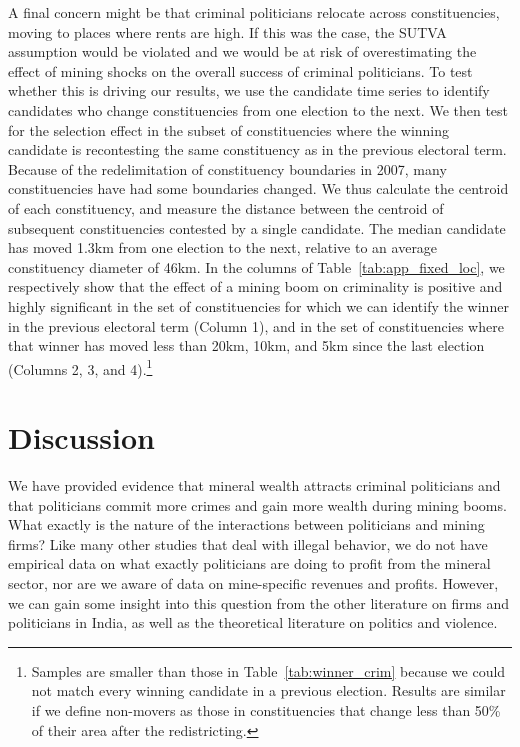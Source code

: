 \documentclass[12pt,letterpaper]{article}
\begin{document}
A final concern might be that criminal politicians relocate across
constituencies, moving to places where rents are high. If this was the
case, the SUTVA assumption would be violated and we would be at risk
of overestimating the effect of mining shocks on the overall success
of criminal politicians. To test whether this is driving our results,
we use the candidate time series to identify candidates who change
constituencies from one election to the next. We then test for the
selection effect in the subset of constituencies where the winning
candidate is recontesting the same constituency as in the previous
electoral term. Because of the redelimitation of constituency
boundaries in 2007, many constituencies have had some boundaries
changed. We thus calculate the centroid of each constituency, and
measure the distance between the centroid of subsequent constituencies
contested by a single candidate. The median candidate has moved 1.3km
from one election to the next, relative to an average constituency
diameter of 46km. In the columns of Table~\ref{tab:app_fixed_loc}, we
respectively show that the effect of a mining boom on criminality is
positive and highly significant in the set of constituencies for which
we can identify the winner in the previous electoral term (Column 1),
and in the set of constituencies where that winner has moved less than
20km, 10km, and 5km since the last election (Columns 2, 3, and
4).\footnote{Samples are smaller than those in
  Table~\ref{tab:winner_crim} because we could not match every winning
  candidate in a previous election. Results are similar if we define
  non-movers as those in constituencies that change less than 50\% of
  their area after the redistricting.}

\section{Discussion}
\label{sec:disc}

We have provided evidence that mineral wealth attracts criminal
politicians and that politicians commit more crimes and gain more
wealth during mining booms. What exactly is the nature of the
interactions between politicians and mining firms?  Like many other
studies that deal with illegal behavior, we do not have empirical data
on what exactly politicians are doing to profit from the mineral
sector, nor are we aware of data on mine-specific revenues and
profits. However, we can gain some insight into this question from the
other literature on firms and politicians in India, as well as the
theoretical literature on politics and violence.
\end{document}

